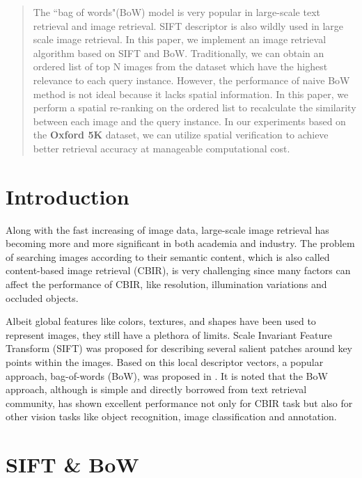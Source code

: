 \documentclass{acm_proc_article-sp}
\begin{document}
\maketitle
\begin{abstract}
The ``bag of words"(BoW) model is very popular in large-scale text retrieval and image retrieval. SIFT descriptor is also wildly used in large scale image retrieval. In this paper, we implement an image retrieval algorithm based on SIFT and BoW. Traditionally, we can obtain an ordered list of top N images from the dataset which have the highest relevance to each query instance. However, the performance of naive BoW method is not ideal because it lacks spatial information. In this paper, we perform a spatial re-ranking on the ordered list to recalculate the similarity between each image and the query instance. In our experiments based on the \textbf{Oxford 5K} dataset, we can utilize spatial verification to achieve better retrieval accuracy at manageable computational cost.
\end{abstract}


\section{Introduction}
Along with the fast increasing of image data, large-scale image retrieval has becoming more and more significant in both academia
and industry. The problem of searching images according to their semantic content, which is also called content-based image retrieval (CBIR), is very challenging since many factors can affect the performance of CBIR, like resolution, illumination variations and occluded objects.\par

Albeit global features like colors, textures, and shapes have been used to represent images, they still have a plethora of  limits. Scale Invariant Feature Transform (SIFT)\cite{aLowe:Object} was proposed for describing several salient patches around key points within the images. Based on this local descriptor vectors, a popular approach, bag-of-words (BoW), was proposed in \cite{bSivic:Video}. It is noted that the BoW approach, although is simple and directly borrowed from text retrieval community, has shown excellent performance not only for CBIR task but also for other vision tasks like object recognition, image classification and annotation.
\section{SIFT \& BoW}
\end{document}
